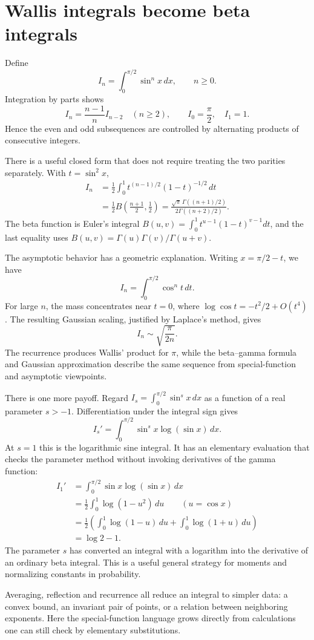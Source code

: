 \section{Wallis integrals become beta integrals}

Define
\[
 I_n=\int_0^{\pi/2}\sin^n x\,dx,\qquad n\ge0.
\]
Integration by parts shows
\[
 I_n=\frac{n-1}{n}I_{n-2}\quad(n\ge2),
 \qquad I_0=\frac\pi2,\quad I_1=1.
\]
Hence the even and odd subsequences are controlled by alternating products of consecutive integers.

There is a useful closed form that does not require treating the two parities separately. With \(t=\sin^2x\),
\[
\begin{aligned}
 I_n&=\frac12\int_0^1
 t^{(n-1)/2}(1-t)^{-1/2}\,dt\\
 &=\frac12 B\left(\frac{n+1}2,\frac12\right)
 =\frac{\sqrt\pi\,\Gamma((n+1)/2)}
        {2\Gamma((n+2)/2)}.
\end{aligned}
\]
The beta function is Euler's integral \(B(u,v)=\int_0^1t^{u-1}(1-t)^{v-1}dt\), and the last equality uses \(B(u,v)=\Gamma(u)\Gamma(v)/\Gamma(u+v)\).

The asymptotic behavior has a geometric explanation. Writing \(x=\pi/2-t\), we have
\[
 I_n=\int_0^{\pi/2}\cos^n t\,dt.
\]
For large \(n\), the mass concentrates near \(t=0\), where
\(\log\cos t=-t^2/2+O(t^4)\). The resulting Gaussian scaling, justified by Laplace's method, gives
\[
 \boxed{I_n\sim\sqrt{\frac{\pi}{2n}}.}
\]
The recurrence produces Wallis' product for \(\pi\), while the beta--gamma formula and Gaussian approximation describe the same sequence from special-function and asymptotic viewpoints.

There is one more payoff. Regard \(I_s=\int_0^{\pi/2}\sin^s x\,dx\) as a function of a real parameter \(s>-1\). Differentiation under the integral sign gives
\[
 I_s'=\int_0^{\pi/2}\sin^s x\log(\sin x)\,dx.
\]
At \(s=1\) this is the logarithmic sine integral. It has an elementary evaluation that checks the parameter method without invoking derivatives of the gamma function:
\[
 \begin{aligned}
 I_1'&=\int_0^{\pi/2}\sin x\log(\sin x)\,dx\\
 &=\frac12\int_0^1\log(1-u^2)\,du
   \qquad(u=\cos x)\\
 &=\frac12\left(
     \int_0^1\log(1-u)\,du+
     \int_0^1\log(1+u)\,du\right)\\
 &=\boxed{\log2-1}.
 \end{aligned}
\]
The parameter \(s\) has converted an integral with a logarithm into the derivative of an ordinary beta integral. This is a useful general strategy for moments and normalizing constants in probability.

Averaging, reflection and recurrence all reduce an integral to simpler data: a convex bound, an invariant pair of points, or a relation between neighboring exponents. Here the special-function language grows directly from calculations one can still check by elementary substitutions.
